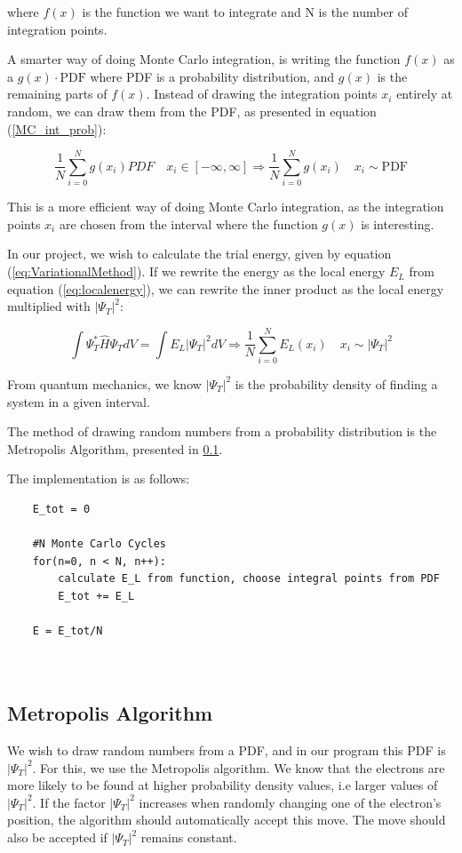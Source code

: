 \documentclass[norsk,a4paper,12pt]{article}
\begin{document}
where $f(x)$ is the function we want to integrate and N is the number of integration points. 

A smarter way of doing Monte Carlo integration, is writing the function $f(x)$ as a $g(x)\cdot \text{PDF}$ where PDF is a probability distribution, and $g(x)$ is the remaining parts of $f(x)$. Instead of drawing the integration points $x_i$ entirely at random, we can draw them from the PDF, as presented in equation (\ref{MC_int_prob}):

\begin{equation}
    \frac{1}{N}\sum_{i=0}^N g(x_i) PDF \quad x_i \in [-\infty, \infty] \Rightarrow \frac{1}{N} \sum_{i=0}^N g(x_i) \quad x_i \sim \text{PDF}
    \label{MC_int_prob}
\end{equation}

This is a more efficient way of doing Monte Carlo integration, as the integration points $x_i$ are chosen from the interval where the function $g(x)$ is interesting.\par 

In our project, we wish to calculate the trial energy, given by equation (\ref{eq:VariationalMethod}). If we rewrite the energy as the local energy $E_L$ from equation (\ref{eq:localenergy}), we can rewrite the inner product as the local energy multiplied with $|\Psi_T|^2$:

\begin{equation}
    \int \Psi_T^* \hat{H} \Psi_T dV = \int E_L |\Psi_T|^2 dV \Rightarrow \frac{1}{N} \sum_{i=0}^N E_L(x_i) \quad x_i \sim |\Psi_T|^2  
\end{equation}

From quantum mechanics, we know $|\Psi_T|^2$ is the probability density of finding a system in a given interval. 

The method of drawing random numbers from a probability distribution is the Metropolis Algorithm, presented in \ref{MetropolisAlgorithm}. 

The implementation is as follows:

\begin{lstlisting}
    E_tot = 0
    
    #N Monte Carlo Cycles
    for(n=0, n < N, n++):
        calculate E_L from function, choose integral points from PDF
        E_tot += E_L
        
    E = E_tot/N
        
    
\end{lstlisting}

\subsection{Metropolis Algorithm} \label{MetropolisAlgorithm}
We wish to draw random numbers from a PDF, and in our program this PDF is $|\Psi_T|^2$. For this, we use the Metropolis algorithm. We know that the electrons are more likely to be found at higher probability density values, i.e larger values of $|\Psi_T|^2$. If the factor $|\Psi_T|^2$ increases when randomly changing one of the electron's position, the algorithm should automatically accept this move. The move should also be accepted if $|\Psi_T|^2$ remains constant.
\end{document}
